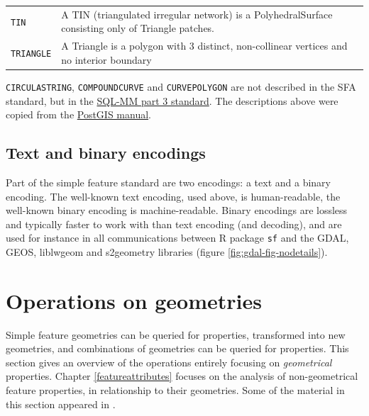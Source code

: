 \documentclass[]{book}
\begin{document}
\begin{longtable}[]{@{}ll@{}}
\begin{minipage}[t]{0.26\columnwidth}
\texttt{TIN}\strut
\end{minipage} & \begin{minipage}[t]{0.68\columnwidth}\raggedright
A TIN (triangulated irregular network) is a PolyhedralSurface consisting only of Triangle patches.\strut
\end{minipage}\tabularnewline
\begin{minipage}[t]{0.26\columnwidth}\raggedright
\texttt{TRIANGLE}\strut
\end{minipage} & \begin{minipage}[t]{0.68\columnwidth}\raggedright
A Triangle is a polygon with 3 distinct, non-collinear vertices and no interior boundary\strut
\end{minipage}\tabularnewline
\bottomrule
\end{longtable}

\texttt{CIRCULASTRING}, \texttt{COMPOUNDCURVE} and \texttt{CURVEPOLYGON} are not
described in the SFA standard, but in the \href{https://www.iso.org/standard/38651.html}{SQL-MM part 3
standard}. The
descriptions above were copied from the \href{http://postgis.net/docs/using_postgis_dbmanagement.html}{PostGIS
manual}.

\hypertarget{text-and-binary-encodings}{%
\subsection{Text and binary encodings}\label{text-and-binary-encodings}}

Part of the simple feature standard are two encodings: a text and
a binary encoding. The well-known text encoding, used above, is
human-readable, the well-known binary encoding is machine-readable.
Binary encodings are lossless and typically faster to work with
than text encoding (and decoding), and are used for instance in all
communications between R package \texttt{sf} and the GDAL, GEOS, liblwgeom
and s2geometry libraries (figure \ref{fig:gdal-fig-nodetails}).

\hypertarget{opgeom}{%
\section{Operations on geometries}\label{opgeom}}

Simple feature geometries can be queried for properties,
transformed into new geometries, and combinations of geometries can
be queried for properties. This section gives an overview of the
operations entirely focusing on \emph{geometrical} properties. Chapter
\ref{featureattributes} focuses on the analysis of non-geometrical
feature properties, in relationship to their geometries. Some of
the material in this section appeared in \citet{rjsf}.
\end{document}
